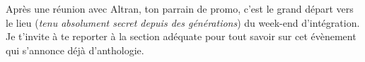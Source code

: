 Après une réunion avec Altran, ton parrain de promo, c'est le grand départ
vers le lieu (\emph{tenu absolument secret depuis des générations}) du week-end
d'intégration. Je t'invite à te reporter à la section adéquate pour tout
savoir sur cet évènement qui s'annonce déjà d'anthologie.

